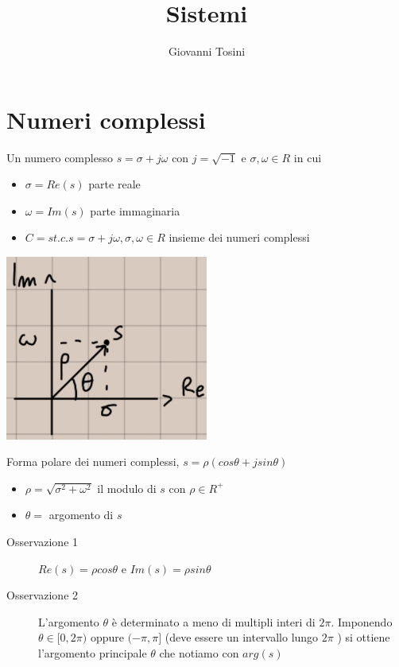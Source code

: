 \documentclass[a4paper, 12pt]{book}
\title{Sistemi}
\author{Giovanni Tosini}
\date{ }
\theoremstyle{plain}
\begin{document}
\begin{titlepage}
    \maketitle
\end{titlepage}

\frontmatter
\tableofcontents
\mainmatter

\chapter{Numeri complessi}

Un numero complesso $s = \sigma + j\omega$ con $j = \sqrt{-1}$ e $\sigma , \omega \in R$ in cui 
\begin{itemize}
    \item $\sigma = Re(s)$ parte reale
    \item $\omega = Im(s)$ parte immaginaria
    \item $C = {s t.c. s = \sigma + j\omega, \sigma , \omega \in R}$ insieme dei numeri complessi
\end{itemize}
\begin{center}
    \includegraphics[width=0.5\textwidth]{num_comp.jpg}
\end{center}
Forma polare dei numeri complessi, $s = \rho (cos\theta +jsin\theta)$
\begin{itemize}
    \item $\rho = \sqrt{\sigma ^2+\omega ^2}$ il modulo di $s$ con $\rho \in R^+$
    \item $\theta =$ argomento di $s$
\end{itemize}
\begin{description}
    \item[Osservazione 1] $Re(s) = \rho cos\theta$ e $Im(s) = \rho sin\theta$
    \item[Osservazione 2] L'argomento $\theta$ è determinato a meno di multipli interi di 
            $2\pi$. Imponendo $\theta \in [0, 2\pi )$ oppure $(-\pi , \pi ]$ (deve essere un intervallo
            lungo $2\pi$ ) si ottiene l'argomento principale $\theta$ che notiamo con $arg(s)$  
\end{description}
\end{document}
